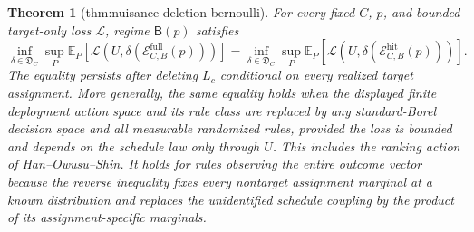 \documentclass{article}
\newtheorem{theorem}{Theorem}
\begin{document}
\begin{theorem}[thm:nuisance-deletion-bernoulli]\label{thm:nuisance-deletion-bernoulli}
For every fixed \(C\), \(p\), and bounded target-only loss \(\mathcal L\), regime \(\mathsf B(p)\) satisfies
\[
\inf_{\delta\in\mathfrak D_C}\sup_P\mathbb E_P[\mathcal L(U,\delta(\mathcal E_{C,B}^{\mathrm{full}}(p)))]
=
\inf_{\delta\in\mathfrak D_C}\sup_P\mathbb E_P[\mathcal L(U,\delta(\mathcal E_{C,B}^{\mathrm{hit}}(p)))].
\]
The equality persists after deleting \(L_c\) conditional on every realized target assignment.  More generally, the same equality holds when the displayed finite deployment action space and its rule class are replaced by any standard-Borel decision space and all measurable randomized rules, provided the loss is bounded and depends on the schedule law only through \(U\).  This includes the ranking action of Han--Owusu--Shin.  It holds for rules observing the entire outcome vector because the reverse inequality fixes every nontarget assignment marginal at a known distribution and replaces the unidentified schedule coupling by the product of its assignment-specific marginals.
\end{theorem}
\end{document}
